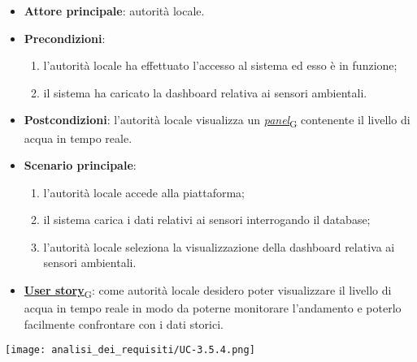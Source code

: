 \begin{itemize}
	\item \textbf{Attore principale}: autorità locale.
	\item \textbf{Precondizioni}:
	      \begin{enumerate}
		      \item l'autorità locale ha effettuato l'accesso al sistema ed esso è in funzione;
		      \item il sistema ha caricato la dashboard relativa ai sensori ambientali.
	      \end{enumerate}
	\item \textbf{Postcondizioni}: l'autorità locale visualizza un \href{https://7last.github.io/docs/pb/documentazione-interna/glossario\#panel}{\textit{panel}\textsubscript{G}} contenente il livello di acqua in tempo reale.
	\item \textbf{Scenario principale}:
	      \begin{enumerate}
		      \item l'autorità locale accede alla piattaforma;
		      \item il sistema carica i dati relativi ai sensori interrogando il database;
		      \item l'autorità locale seleziona la visualizzazione della dashboard relativa ai sensori ambientali.
	      \end{enumerate}
	\item \href{https://7last.github.io/docs/pb/documentazione-interna/glossario\#user-story}{\textbf{User story}\textsubscript{G}}:
	      come autorità locale desidero poter visualizzare il livello di acqua in tempo reale in modo da poterne monitorare l'andamento
	      e poterlo facilmente confrontare con i dati storici.
\end{itemize}
\begin{center}
	\texttt{[image: analisi\_dei\_requisiti/UC-3.5.4.png]}
\end{center}



